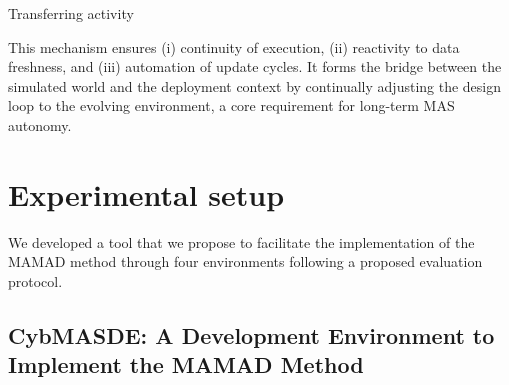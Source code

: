 \documentclass[pdflatex,sn-mathphys-num]{sn-jnl}%
\theoremstyle{thmstyleone}%
\theoremstyle{thmstyletwo}%
\theoremstyle{thmstylethree}%
\begin{document}
\vspace{-0.3em}
\begin{algorithm}[H]
    \caption{Transferring activity}
    \label{alg:transferring}
    \DontPrintSemicolon
    
    \vspace{0.3em}
\end{algorithm}

This mechanism ensures (i) continuity of execution, (ii) reactivity to data freshness, and (iii) automation of update cycles. It forms the bridge between the simulated world and the deployment context by continually adjusting the design loop to the evolving environment, a core requirement for long-term MAS autonomy.


\section{Experimental setup}
\label{sec:experimental_setup}

We developed a tool that we propose to facilitate the implementation of the MAMAD method through four environments following a proposed evaluation protocol.

\subsection{CybMASDE: A Development Environment to Implement the MAMAD Method}
\label{sec:cybmasde}
\end{document}
